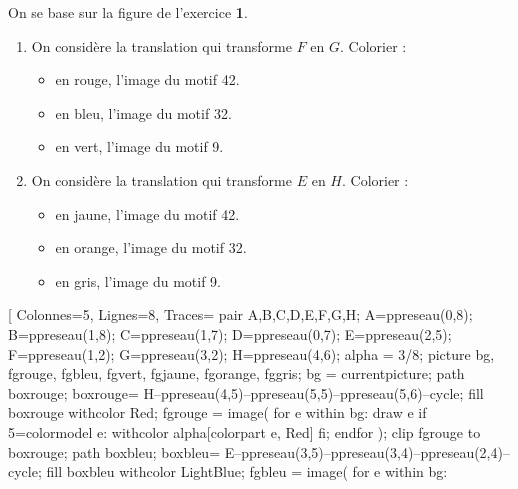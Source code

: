 \begin{corrige}
    On se base sur la figure de l'exercice {\bfseries 1}.\\
    \begin{enumerate}
        \item On considère la translation qui transforme $F$ en $G$. Colorier  :
        \begin{itemize}
            \item en rouge, l'image du motif \num{42}.
            \item en bleu, l'image du motif \num{32}.
            \item en vert, l'image du motif \num{9}.
        \end{itemize}
        \item On considère la translation qui transforme $E$ en $H$. Colorier  :
        \begin{itemize}
            \item en jaune, l'image du motif \num{42}.
            \item en orange, l'image du motif \num{32}.
            \item en gris, l'image du motif \num{9}.
        \end{itemize}
    \end{enumerate}
    \Reseau[%
    Colonnes=5,%
    Lignes=8,%
    Traces={%
        pair A,B,C,D,E,F,G,H; %
        A=ppreseau(0,8);
        B=ppreseau(1,8);
        C=ppreseau(1,7);
        D=ppreseau(0,7);
        E=ppreseau(2,5);
        F=ppreseau(1,2);
        G=ppreseau(3,2);
        H=ppreseau(4,6);
        alpha = 3/8; %
        picture bg, fgrouge, fgbleu, fgvert, fgjaune, fgorange, fggris;
        bg = currentpicture; %
        path boxrouge; boxrouge= H--ppreseau(4,5)--ppreseau(5,5)--ppreseau(5,6)--cycle;        
        fill boxrouge withcolor Red;
        fgrouge = image( 
        for e within bg:
            draw e if 5=colormodel e: withcolor alpha[colorpart e, Red] fi;
        endfor
        );
        clip fgrouge to boxrouge; 
        path boxbleu; boxbleu= E--ppreseau(3,5)--ppreseau(3,4)--ppreseau(2,4)--cycle;
        fill boxbleu withcolor LightBlue;
        fgbleu = image( 
            for e within bg:
}
\end{corrige}
